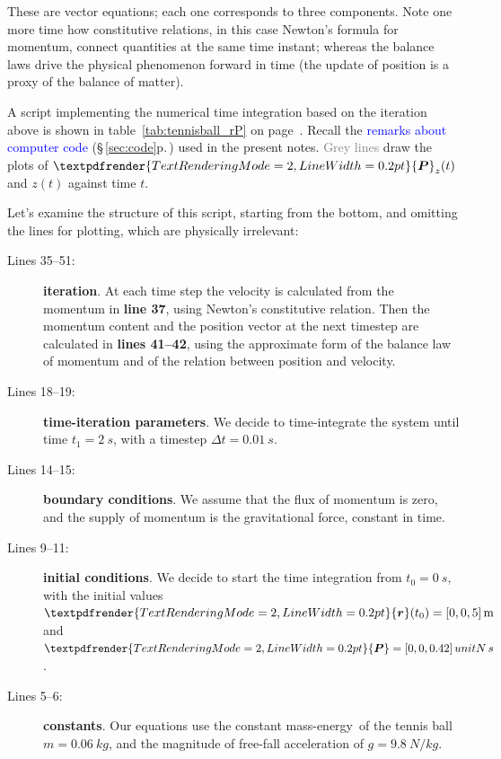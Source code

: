 \documentclass[a4paper,12pt,%
onecolumn,oneside,%
british%
]{memoir}
\renewcommand*{\bm}[1]{\textpdfrender{TextRenderingMode=2,LineWidth=0.2pt}{\boldsymbol{#1}}}
\newcommand*{\incr}{\Delta}%
\renewcommand*{\|}[1][]{\nonscript\:#1\vert\nonscript\:\mathopen{}}
\newcommand*{\sect}{\S}%
\renewcommand*{\autoref}[3][\sect\,\ref]{\textcolor{blue}{#3} {\color{blue}\scriptsize(\faIcon[regular]{eye}\;#1{#2}\;p.\,\pageref{#2})}}
\newcommand*{\masse}{mass-energy}
\newcommand*{\yr}{\bm{r}}
\newcommand*{\yti}{t_{0}}
\newcommand*{\ytf}{t_{1}}
\newcommand*{\Dt}{\incr t}
\newcommand*{\ym}{m}%
\newcommand*{\yP}{\bm{P}}
\begin{document}
These are vector equations; each one corresponds to three components. Note one more time how constitutive relations, in this case Newton's formula for momentum, connect quantities at the same time instant; whereas the balance laws drive the physical phenomenon forward in time (the update of position is a proxy of the balance of matter).

\medskip

A script implementing the numerical time integration based on the iteration above is shown in table~\ref{tab:tennisball_rP} on page~\pageref{tab:tennisball_rP}. Recall the \autoref{sec:code}{remarks about computer code} used in the present notes. \textcolor{grey}{Grey lines} draw the plots of $\yP_{z}(t)$ and $z(t)$ against time $t$.

Let's examine the structure of this script, starting from the bottom, and omitting the lines for plotting, which are physically irrelevant:
\begin{description}
\item[Lines 35--51:] \textbf{iteration}. At each time step the velocity is calculated from the momentum in \textbf{line 37}, using Newton's constitutive relation. Then the momentum content and the position vector at the next timestep are calculated in \textbf{lines 41--42}, using the approximate form of the balance law of momentum and of the relation between position and velocity.
\item[Lines 18--19:] \textbf{time-iteration parameters}. We decide to time-integrate the system until time $\ytf = \qty{2}{s}$, with a timestep $\Dt = \qty{0.01}{s}$.
\item[Lines 14--15:] \textbf{boundary conditions}. We assume that the flux of momentum is zero, and the supply of momentum is the gravitational force, constant in time.
\item[Lines 9--11:] \textbf{initial conditions}. We decide to start the time integration from $\yti = \qty{0}{s}$, with the initial values $\yr(\yti) = [0,0,5]\,\unit{m}$ and $\yP = [0,0,\num{0.42}]\,unit{N\,s}$.
\item[Lines 5--6:] \textbf{constants}. Our equations use the constant \masse\ of the tennis ball $\ym = \qty{0.06}{kg}$, and the magnitude of free-fall acceleration of  $g = \qty{9.8}{N/kg}$.
\end{description}
\end{document}
